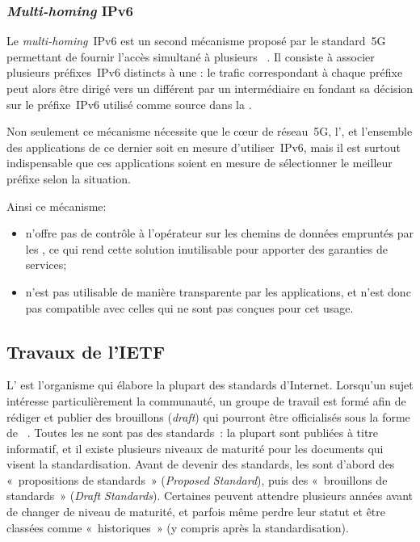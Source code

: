 \documentclass[../main.tex]{subfiles}
\begin{document}
\subsubsection{\textit{Multi-homing} IPv6}
Le \textit{multi-homing}~IPv6 est un second mécanisme proposé par le standard~5G permettant de fournir l’accès simultané à plusieurs ~\cite{3GPP.TS.23.501}.
Il consiste à associer plusieurs préfixes~IPv6 distincts à une : le trafic correspondant à chaque préfixe peut alors être dirigé vers un  différent par un  intermédiaire en fondant sa décision sur le préfixe~IPv6 utilisé comme source dans la .

Non seulement ce mécanisme nécessite que le cœur de réseau~5G, l’, et l’ensemble des applications de ce dernier soit en mesure d’utiliser~IPv6, mais il est surtout indispensable que ces applications soient en mesure de sélectionner le meilleur préfixe selon la situation.

Ainsi ce mécanisme:
\begin{itemize}
    \item n’offre pas de contrôle à l’opérateur sur les chemins de données empruntés par les , ce qui rend cette solution inutilisable pour apporter des garanties de services;
    \item n’est pas utilisable de manière transparente par les applications, et n’est donc pas compatible avec celles qui ne sont pas conçues pour cet usage.
\end{itemize}

\subsection{Travaux de l’IETF}
\label{sec:ietf}
L’ est l’organisme qui élabore la plupart des standards d’Internet.
Lorsqu’un sujet intéresse particulièrement la communauté, un groupe de travail est formé afin de rédiger et publier des brouillons (\textit{draft}) qui pourront être officialisés sous la forme de ~\cite{rfc2026}. 
Toutes les  ne sont pas des standards~\cite{rfc1796}: la plupart sont publiées à titre informatif, et il existe plusieurs niveaux de maturité pour les documents qui visent la standardisation.
Avant de devenir des standards, les  sont d’abord des « propositions de standards » (\textit{Proposed Standard}), puis des « brouillons de standards » (\textit{Draft Standards}).
Certaines  peuvent attendre plusieurs années avant de changer de niveau de maturité, et parfois même perdre leur statut et être classées comme « historiques » (y compris après la standardisation).
\end{document}
